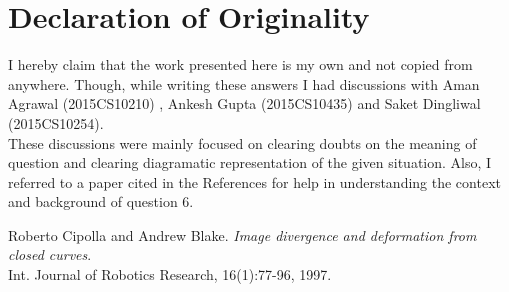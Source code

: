 \documentclass{article}
\begin{document}
\section*{Declaration of Originality}
I hereby claim that the work presented here is my own and not copied from anywhere. Though, while writing these
answers I had discussions with Aman Agrawal (2015CS10210) , Ankesh Gupta (2015CS10435) and Saket Dingliwal (2015CS10254).\\
These discussions were mainly focused on clearing doubts on the meaning of question and clearing diagramatic representation
of the given situation. Also, I referred to a paper cited in the References for help in understanding the context and
background of question 6.\\

\begin{thebibliography}{1}
  Roberto Cipolla and Andrew Blake.
  \textit{Image divergence and deformation from closed curves}.\\ 
  Int. Journal of Robotics Research, 16(1):77-96, 1997.
\end{thebibliography}
\end{document}
